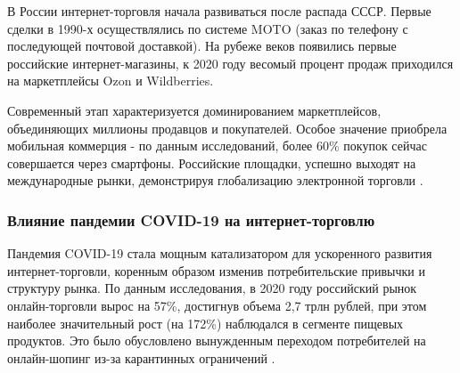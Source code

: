 В России интернет-торговля начала развиваться после распада СССР. Первые сделки в 1990-х осуществлялись по системе MOTO (заказ по телефону с последующей почтовой доставкой). На рубеже веков появились первые российские интернет-магазины, к 2020 году весомый процент продаж приходился на маркетплейсы Ozon и Wildberries.

Современный этап характеризуется доминированием маркетплейсов, объединяющих миллионы продавцов и покупателей. Особое значение приобрела мобильная коммерция - по данным исследований, более 60\% покупок сейчас совершается через смартфоны. Российские площадки, успешно выходят на международные рынки, демонстрируя глобализацию электронной торговли \cite{10}.

\subsubsection{Влияние пандемии COVID-19 на интернет-торговлю}

Пандемия COVID-19 стала мощным катализатором для ускоренного развития интернет-торговли, коренным образом изменив потребительские привычки и структуру рынка. По данным исследования, в 2020 году российский рынок онлайн-торговли вырос на 57\%, достигнув объема 2,7 трлн рублей, при этом наиболее значительный рост (на 172\%) наблюдался в сегменте пищевых продуктов. Это было обусловлено вынужденным переходом потребителей на онлайн-шопинг из-за карантинных ограничений \cite{11}.

